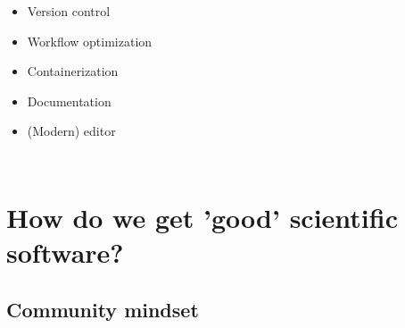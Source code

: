 \documentclass[usenames,dvipsnames]{beamer}
\theoremstyle{plain}
\theoremstyle{definition}
\begin{document}




\begin{frame}{\setframetitle{}}

  \begin{columns}[t]

    \begin{itemize}
    \item Version control

      \item Workflow optimization

        \item Containerization

          \item Documentation

            \item (Modern) editor
    \end{itemize}

    \begin{figure}
   {}
    \end{figure}
  \end{columns}

\end{frame}








\section{How do we get 'good' scientific software?}
\subsection{Community mindset}


\begin{frame}{\setframetitle{}}

 \begin{figure}
         {}
 \end{figure}

\end{frame}
\end{document}
